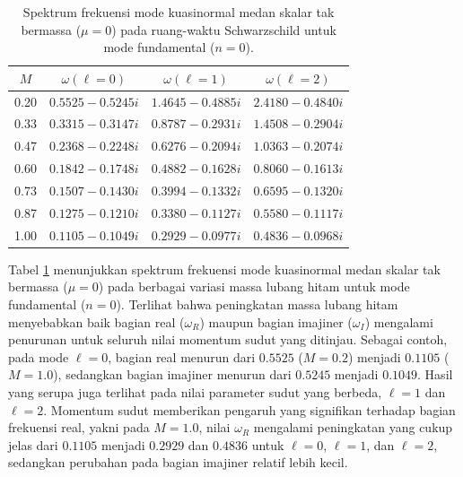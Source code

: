 \begin{table}[H]
\centering
\caption{Spektrum frekuensi mode kuasinormal medan skalar tak bermassa ($\mu=0$) pada ruang-waktu Schwarzschild untuk mode fundamental ($n=0$).}
\vspace{0.2cm}
\renewcommand{\arraystretch}{1.25}
\begin{tabular}{cccc}
\toprule
$M$ & $\omega(\ell=0)$ & $\omega(\ell=1)$ & $\omega(\ell=2)$ \\
\midrule
0.20 & $0.5525 - 0.5245i$ & $1.4645 - 0.4885i$ & $2.4180 - 0.4840i$ \\
0.33   & $0.3315 - 0.3147i$ & $0.8787 - 0.2931i$ & $1.4508 - 0.2904i$ \\
0.47   & $0.2368 - 0.2248i$ & $0.6276 - 0.2094i$ & $1.0363 - 0.2074i$ \\
0.60   & $0.1842 - 0.1748i$ & $0.4882 - 0.1628i$ & $0.8060 - 0.1613i$ \\
0.73   & $0.1507 - 0.1430i$ & $0.3994 - 0.1332i$ & $0.6595 - 0.1320i$ \\
0.87   & $0.1275 - 0.1210i$ & $0.3380 - 0.1127i$ & $0.5580 - 0.1117i$ \\
1.00    & $0.1105 - 0.1049i$ & $0.2929 - 0.0977i$ & $0.4836 - 0.0968i$ \\
\bottomrule
\end{tabular}
\label{tab:sch_mu0_n0}
\end{table}

Tabel \ref{tab:sch_mu0_n0} menunjukkan spektrum frekuensi mode kuasinormal medan skalar tak bermassa ($\mu=0$) pada berbagai variasi massa lubang hitam untuk mode fundamental ($n=0$). Terlihat bahwa peningkatan massa lubang hitam menyebabkan baik bagian real ($\omega_R$) maupun bagian imajiner ($\omega_I$) mengalami penurunan untuk seluruh nilai momentum sudut yang ditinjau. Sebagai contoh, pada mode $\ell=0$, bagian real menurun dari $0.5525$ ($M=0.2$) menjadi $0.1105$ ($M=1.0$), sedangkan bagian imajiner menurun dari $0.5245$ menjadi $0.1049$. Hasil yang serupa juga terlihat pada nilai parameter sudut yang berbeda, $\ell=1$ dan $\ell=2$. Momentum sudut memberikan pengaruh yang signifikan terhadap bagian frekuensi real, yakni pada $M=1.0$, nilai $\omega_R$ mengalami peningkatan yang cukup jelas dari $0.1105$ menjadi $0.2929$ dan $0.4836$ untuk $\ell=0$, $\ell=1$, dan $\ell=2$, sedangkan perubahan pada bagian imajiner relatif lebih kecil.


